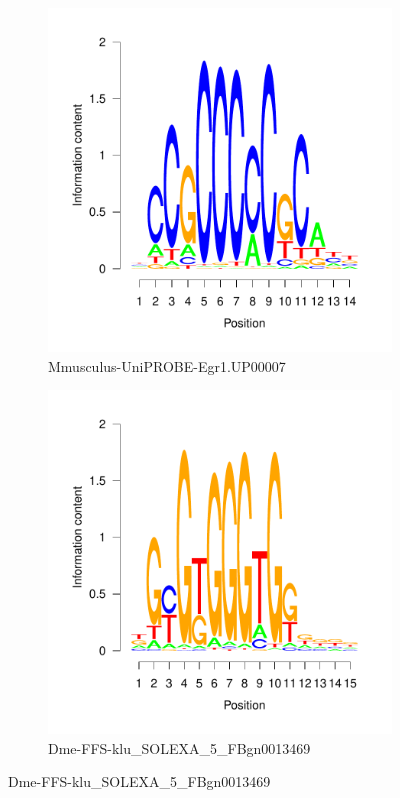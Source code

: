 \documentclass{article}
\begin{document}
\begin{figure}[htpb!]
  \centering
  \begin{subfigure}[b]{0.38\textwidth}
    \includegraphics[width=\textwidth]{MotifDb-logo5}
    \caption{Mmusculus-UniPROBE-Egr1.UP00007}
    \label{fig:Egr1-logo5}
    \end{subfigure}%
  \begin{subfigure}[b]{0.38\textwidth}
    \centering
    \includegraphics[width=\textwidth]{MotifDb-logo6}
    \caption{Dme-FFS-klu\_SOLEXA\_5\_FBgn0013469}
    \label{fig:Egr1-logo6}
    \end{subfigure}%
\end{figure}
\end{document}
